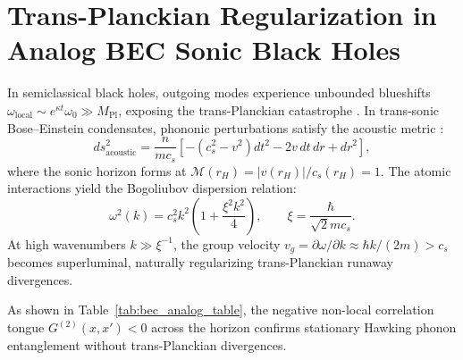 \documentclass[11pt,a4paper,reqno]{article}
\theoremstyle{definition}
\numberwithin{equation}{section}
\begin{document}
\section{Trans-Planckian Regularization in Analog BEC Sonic Black Holes}
\label{sec:bec_analog}

In semiclassical black holes, outgoing modes experience unbounded blueshifts $\omega_{\text{local}} \sim e^{\kappa t} \omega_0 \gg M_{\text{Pl}}$, exposing the trans-Planckian catastrophe \cite{Hawking1975}. In trans-sonic Bose--Einstein condensates, phononic perturbations satisfy the acoustic metric \cite{Steinhauer2016}:
\begin{equation}
ds_{\text{acoustic}}^2 = \frac{n}{m c_s} \left[ -\left(c_s^2 - v^2\right) dt^2 - 2v\, dt\, dr + dr^2 \right],
\end{equation}
where the sonic horizon forms at $\mathcal{M}(r_H) = |v(r_H)| / c_s(r_H) = 1$. The atomic interactions yield the Bogoliubov dispersion relation:
\begin{equation}
\omega^2(k) = c_s^2 k^2 \left( 1 + \frac{\xi^2 k^2}{4} \right), \qquad \xi = \frac{\hbar}{\sqrt{2} m c_s}.
\label{eq:bogoliubov_dispersion}
\end{equation}
At high wavenumbers $k \gg \xi^{-1}$, the group velocity $v_g = \partial \omega / \partial k \approx \hbar k / (2m) > c_s$ becomes superluminal, naturally regularizing trans-Planckian runaway divergences.

\begin{table}[htbp]
\centering
\caption{Analog BEC Sonic Black Hole Parameters and Regularized Trans-Planckian Entanglement Tongues.}
\label{tab:bec_analog_table}
\end{table}

As shown in Table~\ref{tab:bec_analog_table}, the negative non-local correlation tongue $G^{(2)}(x, x') < 0$ across the horizon confirms stationary Hawking phonon entanglement without trans-Planckian divergences.
\end{document}
